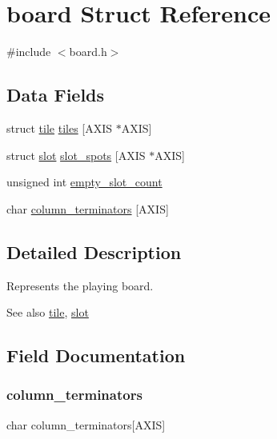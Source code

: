 \hypertarget{structboard}{}\section{board Struct Reference}
\label{structboard}


{\ttfamily \#include $<$board.\+h$>$}

\subsection*{Data Fields}
\begin{DoxyCompactItemize}
\item 
struct \hyperlink{structtile}{tile} \hyperlink{structboard_a9a07d9c64ba17e22959b01a882af8f5a}{tiles} \mbox{[}A\+X\+IS $\ast$A\+X\+IS\mbox{]}
\item 
struct \hyperlink{structslot}{slot} \hyperlink{structboard_a0976bf1c9ed67dc54c53cd5e2bc004eb}{slot\+\_\+spots} \mbox{[}A\+X\+IS $\ast$A\+X\+IS\mbox{]}
\item 
unsigned int \hyperlink{structboard_a7bf16d3c2cc54954ec3d5b52c0012733}{empty\+\_\+slot\+\_\+count}
\item 
char \hyperlink{structboard_a2f3b2c9fbf94f113f8d0ca82f5e7c2a2}{column\+\_\+terminators} \mbox{[}A\+X\+IS\mbox{]}
\end{DoxyCompactItemize}


\subsection{Detailed Description}
Represents the playing board. \begin{DoxySeeAlso}{See also}
\hyperlink{structtile}{tile}, \hyperlink{structslot}{slot} 
\end{DoxySeeAlso}


\subsection{Field Documentation}
\hypertarget{structboard_a2f3b2c9fbf94f113f8d0ca82f5e7c2a2}{}\label{structboard_a2f3b2c9fbf94f113f8d0ca82f5e7c2a2} 
\subsubsection{\texorpdfstring{column\+\_\+terminators}{column\_terminators}}
{\footnotesize\ttfamily char column\+\_\+terminators\mbox{[}A\+X\+IS\mbox{]}}

